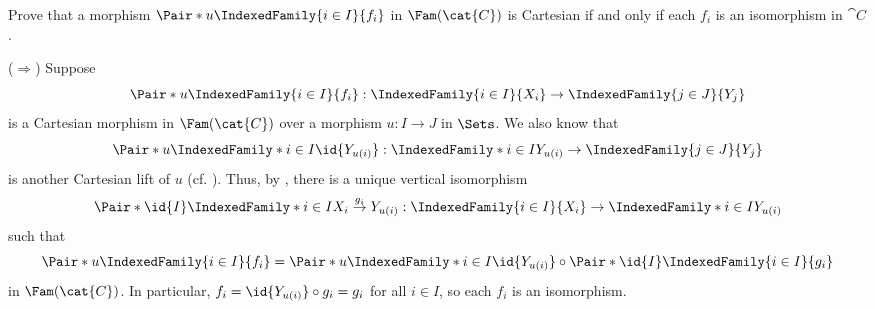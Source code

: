 \begin{exercise}
Prove that a morphism \(\Pair*{u}{\IndexedFamily{i \in I}{f_i}}\) in \(\Fam(\cat{C})\) is Cartesian if and only if each \(f_i\) is an isomorphism in \(\cat{C}\).
\end{exercise}

\begin{solution}
(\(\Longrightarrow\))
Suppose
\begin{equation*}
\Pair*{u}{\IndexedFamily{i \in I}{f_i}} : \IndexedFamily{i \in I}{X_i} \to \IndexedFamily{j \in J}{Y_j}
\end{equation*}
is a Cartesian morphism in \(\Fam(\cat{C})\) over a morphism \(u : I \to J\) in \(\Sets\).
We also know that
\begin{equation*}
\Pair*{u}{\IndexedFamily*{i \in I}{\id{Y_{u(i)}}}} : \IndexedFamily*{i \in I}{Y_{u(i)}} \to \IndexedFamily{j \in J}{Y_j}
\end{equation*}
is another Cartesian lift of \(u\) (cf. \cite[preceding Definition~1.2.1]{MR1674451}).
Thus, by , there is a unique vertical isomorphism
\begin{equation*}
\Pair*{\id{I}}{\IndexedFamily*{i \in I}{X_i \overset{g_i}{\to} Y_{u(i)}}} : \IndexedFamily{i \in I}{X_i} \to \IndexedFamily*{i \in I}{Y_{u(i)}}
\end{equation*}
such that
\begin{equation*}
\Pair*{u}{\IndexedFamily{i \in I}{f_i}}
= \Pair*{u}{\IndexedFamily*{i \in I}{\id{Y_{u(i)}}}} \circ \Pair*{\id{I}}{\IndexedFamily{i \in I}{g_i}}
\end{equation*}
in \(\Fam(\cat{C})\).
In particular, \(f_i = \id{Y_{u(i)}} \circ g_i = g_i\) for all \(i \in I\), so each \(f_i\) is an isomorphism.


\end{solution}
